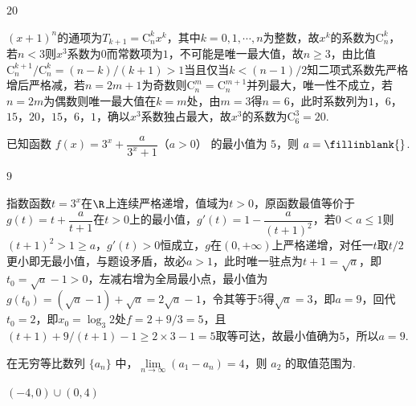 \begin{answer}
\(20\)
\end{answer}

\begin{solution}
\(\left( x+1 \right)^n\)的通项为\(T_{k+1}=\mathrm C_n^k x^k\)，其中\(k=0,1,\cdots,n\)为整数，故\(x^k\)的系数为\(\mathrm C_n^k\)，若\(n<3\)则\(x^3\)系数为\(0\)而常数项为\(1\)，不可能是唯一最大值，故\(n\ge 3\)，由比值\(\mathrm C_n^{k+1}/\mathrm C_n^k=\left( n-k \right)/\left( k+1 \right)>1\)当且仅当\(k<\left( n-1 \right)/2\)知二项式系数先严格增后严格减，若\(n=2m+1\)为奇数则\(\mathrm C_n^m=\mathrm C_n^{m+1}\)并列最大，唯一性不成立，若\(n=2m\)为偶数则唯一最大值在\(k=m\)处，由\(m=3\)得\(n=6\)，此时系数列为\(1\)，\(6\)，\(15\)，\(20\)，\(15\)，\(6\)，\(1\)，确以\(x^3\)系数独占最大，故\(x^3\)的系数为\(\mathrm C_6^3=20\).
\end{solution}

\begin{problem}
已知函数 \(f(x)=3^x+\dfrac{a}{3^x+1}\)（\(a>0\)） 的最小值为 \(5\)，则 \(a=\fillinblank{}\).
\end{problem}

\begin{answer}
\(9\)
\end{answer}

\begin{solution}
指数函数\(t=3^x\)在\(\R\)上连续严格递增，值域为\(t>0\)，原函数最值等价于\(g\left( t \right)=t+\dfrac{a}{t+1}\)在\(t>0\)上的最小值，\(g'\left( t \right)=1-\dfrac{a}{\left( t+1 \right)^2}\)，若\(0<a\le 1\)则\(\left( t+1 \right)^2>1\ge a\)，\(g'\left( t \right)>0\)恒成立，\(g\)在\(\left( 0,+\infty \right)\)上严格递增，对任一\(t\)取\(t/2\)更小即无最小值，与题设矛盾，故必\(a>1\)，此时唯一驻点为\(t+1=\sqrt{a}\)，即\(t_0=\sqrt{a}-1>0\)，左减右增为全局最小点，最小值为\(g\left( t_0 \right)=\left( \sqrt{a}-1 \right)+\sqrt{a}=2\sqrt{a}-1\)，令其等于\(5\)得\(\sqrt{a}=3\)，即\(a=9\)，回代\(t_0=2\)，即\(x_0=\log_3 2\)处\(f=2+9/3=5\)，且\(\left( t+1 \right)+9/\left( t+1 \right)-1\ge 2\times 3-1=5\)取等可达，故最小值确为\(5\)，所以\(a=9\).
\end{solution}

\begin{problem}
在无穷等比数列 \(\{a_n\}\) 中，\(\lim\limits_{n\to\infty}(a_1-a_n)=4\)，则 \(a_2\) 的取值范围为\fillinblank{}.
\end{problem}

\begin{answer}
\((-4,0)\cup(0,4)\)
\end{answer}

